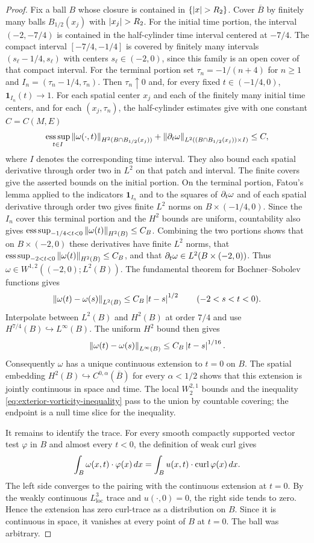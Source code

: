 \documentclass[11pt,letterpaper]{article}
\numberwithin{equation}{section}
\theoremstyle{plain}
\theoremstyle{definition}
\theoremstyle{remark}
\begin{document}
\begin{proof}
Fix a ball $B$ whose closure is contained in $\{\left\lvert x\right\rvert>R_2\}$. Cover
$\overline B$ by finitely many balls $B_{1/2}(x_j)$ with
$\left\lvert x_j\right\rvert>R_2$. For the initial time portion, the interval $(-2,-7/4)$
is contained in the half-cylinder time interval centered at $-7/4$.
The compact interval $[-7/4,-1/4]$ is covered by finitely many intervals
$(s_\ell-1/4,s_\ell)$ with centers $s_\ell\in(-2,0)$, since this family
is an open cover of that compact interval. For the terminal portion set
$\tau_n=-1/(n+4)$ for $n\ge1$ and $I_n=(\tau_n-1/4,\tau_n)$. Then
$\tau_n\uparrow0$ and, for every fixed $t\in(-1/4,0)$,
$\mathbf1_{I_n}(t)\to1$. For each spatial center $x_j$ and each of the
finitely many initial time centers, and for each $(x_j,\tau_n)$, the
half-cylinder estimates give with one constant $C=C(M,E)$
\[
 \operatorname*{ess\,sup}_{t\in I}\left\lVert \omega(\cdot,t)\right\rVert_{H^2(B\cap B_{1/2}(x_j))}
 +\left\lVert \partial_t\omega\right\rVert_{L^2((B\cap B_{1/2}(x_j))\times I)}
 \le C,
\]
where $I$ denotes the corresponding time interval. They also bound each
spatial derivative through order two in $L^2$ on that patch and interval.
The finite covers give the asserted bounds on the initial portion. On the
terminal portion, Fatou's lemma applied to the indicators $\mathbf1_{I_n}$
and to the squares of $\partial_t\omega$ and of each spatial derivative through
order two gives finite $L^2$ norms on $B\times(-1/4,0)$. Since the $I_n$
cover this terminal portion and the $H^2$ bounds are uniform, countability
also gives $\operatorname*{ess\,sup}_{-1/4<t<0}\left\lVert \omega(t)\right\rVert_{H^2(B)}\le C_B$.
Combining the two portions shows that on $B\times(-2,0)$ these derivatives
have finite $L^2$ norms, that
$\operatorname*{ess\,sup}_{-2<t<0}\left\lVert \omega(t)\right\rVert_{H^2(B)}\le C_B$, and that
$\partial_t\omega\in L^2(B\times(-2,0))$. Thus
$\omega\in W^{1,2}((-2,0);L^2(B))$. The fundamental theorem for
Bochner--Sobolev functions gives
\[
 \left\lVert \omega(t)-\omega(s)\right\rVert_{L^2(B)}
 \le C_B\left\lvert t-s\right\rvert^{1/2}\qquad(-2<s<t<0).
\]
Interpolate between $L^2(B)$ and $H^2(B)$ at order $7/4$ and use
$H^{7/4}(B)\hookrightarrow L^\infty(B)$. The uniform $H^2$ bound then
gives
\[
 \left\lVert \omega(t)-\omega(s)\right\rVert_{L^\infty(B)}
 \le C_B\left\lvert t-s\right\rvert^{1/16}.
\]
Consequently $\omega$ has a unique continuous extension to $t=0$ on $B$.
The spatial embedding $H^2(B)\hookrightarrow C^{0,\alpha}(\overline B)$
for every $\alpha<1/2$ shows that this extension is jointly continuous in
space and time. The local $W^{2,1}_2$ bounds and the inequality
\eqref{eq:exterior-vorticity-inequality} pass to the union by countable
covering; the endpoint is a null time slice for the inequality.

It remains to identify the trace. For every smooth compactly supported
vector test $\varphi$ in $B$ and almost every $t<0$, the definition of weak
curl gives
\[
 \int_B\omega(x,t)\cdot\varphi(x)\,dx
 =\int_B u(x,t)\cdot\operatorname{curl}\varphi(x)\,dx.
\]
The left side converges to the pairing with the continuous extension at
$t=0$. By the weakly continuous $L^3_{\mathrm{loc}}$ trace and
$u(\cdot,0)=0$, the right side tends to zero. Hence the extension has zero
curl-trace as a distribution on $B$. Since it is continuous in space, it
vanishes at every point of $B$ at $t=0$. The ball was arbitrary.
\end{proof}
\end{document}
